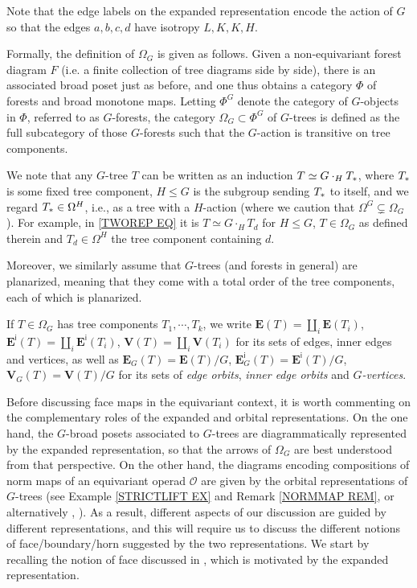 \documentclass[a4paper,10pt
 ,draft
]{article}%
\begin{document}
Note that the edge labels on the expanded representation encode the action of $G$ so that the edges 
$a,b,c,d$ have isotropy $L,K,K,H$.

Formally, the definition of $\Omega_G$ \cite[Def. 5.44]{Per18} is given as follows.
Given a non-equivariant forest diagram $F$ 
(i.e. a finite collection of tree diagrams side by side),
there is
an associated broad poset just as before, and one thus obtains a category $\Phi$ of forests and broad monotone maps.
Letting $\Phi^G$ denote the category of $G$-objects in $\Phi$, referred to as $G$-forests,
the category $\Omega_G \subset \Phi^G$ of $G$-trees
is defined as the full subcategory of those $G$-forests such that the $G$-action is transitive on tree components.

We note that any $G$-tree $T$ can be written as
an induction $T \simeq G \cdot_H T_{\**}$, where $T_{\**}$ is some fixed tree component, $H\leq G$ is the subgroup sending $T_{\**}$ to itself,
and we regard $T_{\**} \in \Omega^H$, i.e., as a tree with a $H$-action (where we caution that $\Omega^G \subsetneq \Omega_G$).
For example, in \eqref{TWOREP EQ} it is 
$T \simeq G \cdot_H T_d$ for $H\leq G$, $T \in \Omega_G$ as defined therein and
$T_d \in \Omega^H$ the tree component containing $d$. 

Moreover, we similarly assume that $G$-trees (and forests in general) are planarized, meaning that they come with a total order of the tree components, each of which is  planarized.

If $T\in \Omega_G$ has tree components $T_1,\cdots, T_k$, we write
$\boldsymbol{E}(T) = \amalg_i \boldsymbol{E}(T_i)$, 
$\boldsymbol{E}^{\mathsf{i}}(T) = 
\amalg_i \boldsymbol{E}^{\mathsf{i}}(T_i)$,
$\boldsymbol{V}(T) = \amalg_i \boldsymbol{V}(T_i)$
for its sets of edges, inner edges and vertices, as well as
$\boldsymbol{E}_G(T) = \boldsymbol{E}(T)/G$,
$\boldsymbol{E}^{\mathsf{i}}_G(T) = \boldsymbol{E}^{\mathsf{i}}(T)/G$,
$\boldsymbol{V}_G(T) = \boldsymbol{V}(T)/G$ for its sets of 
\textit{edge orbits},
\textit{inner edge orbits} and
\textit{$G$-vertices}.

Before discussing face maps in the equivariant context, it is worth commenting on the complementary roles of the expanded and orbital representations.
On the one hand, the $G$-broad posets associated to $G$-trees are diagrammatically represented by the expanded representation,
so that the arrows of $\Omega_{G}$ are best understood from that perspective.
On the other hand, the diagrams encoding compositions of norm maps of an equivariant operad $\mathcal{O}$
are given by the orbital representations of  
$G$-trees (see Example \ref{STRICTLIFT EX} and Remark \ref{NORMMAP REM}, or alternatively 
\cite[Ex. 4.9]{Per18}, \cite[(1.10)]{BP17}).
As a result, different aspects of our discussion are guided by different representations, and this will require us to discuss the different notions of face/boundary/horn suggested by the two representations.
We start by recalling the notion of face discussed in \cite{Per18}, which is motivated by the expanded representation.
\end{document}
